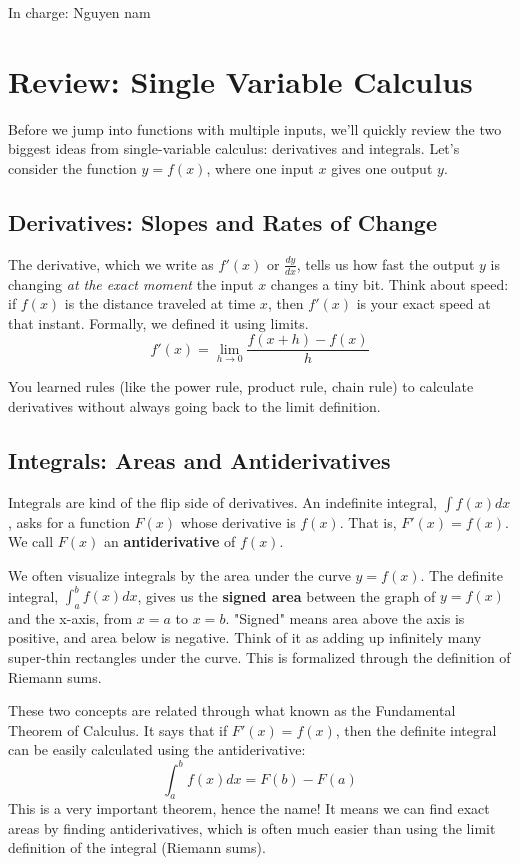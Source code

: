 \documentclass[11pt]{article}
\begin{document}




In charge: Nguyen nam

\section{Review: Single Variable Calculus}

Before we jump into functions with multiple inputs, we'll quickly review the two biggest ideas from single-variable calculus: derivatives and integrals. Let's consider the function $y = f(x)$, where one input $x$ gives one output $y$.

\subsection{Derivatives: Slopes and Rates of Change}
The derivative, which we write as $f'(x)$ or $\frac{dy}{dx}$, tells us how fast the output $y$ is changing \emph{at the exact moment} the input $x$ changes a tiny bit. Think about speed: if $f(x)$ is the distance traveled at time $x$, then $f'(x)$ is your exact speed at that instant. Formally, we defined it using limits.
    $$ f'(x) = \lim_{h \to 0} \frac{f(x+h) - f(x)}{h} $$

You learned rules (like the power rule, product rule, chain rule) to calculate derivatives without always going back to the limit definition.

\subsection{Integrals: Areas and Antiderivatives}

Integrals are kind of the flip side of derivatives. An indefinite integral, $\int f(x) dx$, asks for a function $F(x)$ whose derivative is $f(x)$. That is, $F'(x) = f(x)$. We call $F(x)$ an \textbf{antiderivative} of $f(x)$.

 We often visualize integrals by the area under the curve $y=f(x)$. The definite integral, $\int_{a}^{b} f(x) dx$, gives us the \textbf{signed area} between the graph of $y=f(x)$ and the x-axis, from $x=a$ to $x=b$. "Signed" means area above the axis is positive, and area below is negative. Think of it as adding up infinitely many super-thin rectangles under the curve. This is formalized through the definition of Riemann sums.

These two concepts are related through what known as the Fundamental Theorem of Calculus.
It says that if $F'(x) = f(x)$, then the definite integral can be easily calculated using the antiderivative:
    $$ \int_{a}^{b} f(x) dx = F(b) - F(a) $$
    This is a very important theorem, hence the name! It means we can find exact areas by finding antiderivatives, which is often much easier than using the limit definition of the integral (Riemann sums).
\end{document}
